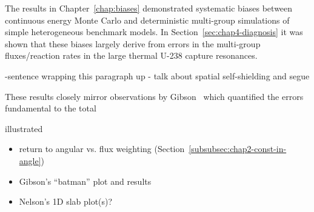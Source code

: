 The results in Chapter~\ref{chap:biases} demonstrated systematic biases between continuous energy Monte Carlo and deterministic multi-group simulations of simple heterogeneous benchmark models. In Section~\ref{sec:chap4-diagnosis} it was shown that these biases largely derive from errors in the multi-group fluxes/reaction rates in the large thermal U-238 capture resonances. 

-sentence wrapping this paragraph up - talk about spatial self-shielding and segue

These results closely mirror observations by Gibson~\cite{gibson2016thesis} which quantified the errors fundamental to the total 

 illustrated 

\begin{itemize}[noitemsep]
  \item return to angular vs. flux weighting (Section~\ref{subsubsec:chap2-const-in-angle})
  \item Gibson's ``batman'' plot and results
  \item Nelson's 1D slab plot(s)?
\end{itemize}

\cite{gibson2016thesis}


